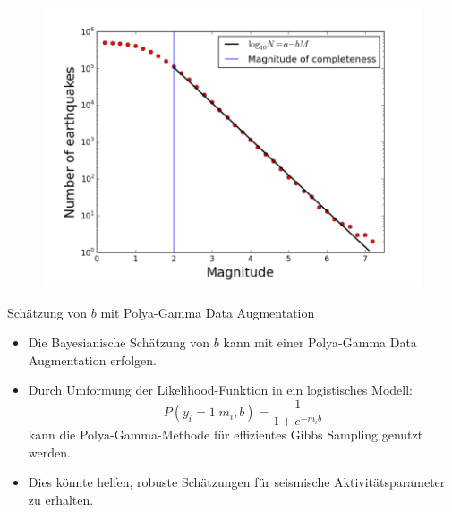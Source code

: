 \documentclass{beamer}
\begin{document}
		\begin{frame}
		\begin{figure}
			\centering
			\includegraphics[width=0.95\linewidth]{erdbeben3}
			\label{fig:erdbeben1}
		\end{figure}
	\end{frame}
	
	
	\begin{frame}{Schätzung von $b$ mit Polya-Gamma Data Augmentation}
		\begin{itemize}
			\item Die Bayesianische Schätzung von $b$ kann mit einer Polya-Gamma Data Augmentation erfolgen.
			\item Durch Umformung der Likelihood-Funktion in ein logistisches Modell:
			\begin{equation}
				P(y_i = 1 | m_i, b) = \frac{1}{1 + e^{-m_i b}}
			\end{equation}
			kann die Polya-Gamma-Methode für effizientes Gibbs Sampling genutzt werden.
			\item Dies könnte helfen, robuste Schätzungen für seismische Aktivitätsparameter zu erhalten.
		\end{itemize}
	\end{frame}
	
\end{document}
